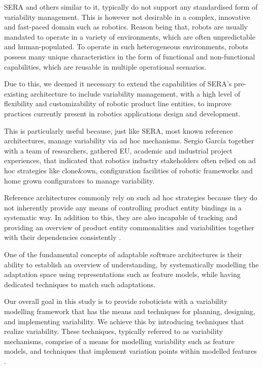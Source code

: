 \documentclass[conference]{IEEEtran}
\begin{document}
SERA and others similar to it, typically do not support any standardised form of variability management. This is however not desirable in a complex, innovative and fast-paced domain such as robotics. Reason being that, robots are usually mandated to operate in a variety of environments, which are often unpredictable and human-populated. To operate in such heterogeneous environments, robots possess many unique characteristics in the form of functional and non-functional capabilities, which are reusable in multiple operational scenarios.

Due to this, we deemed it necessary to extend the capabilities of SERA's pre-existing architecture to include variability management, with a high level of flexibility and customizability of robotic product line entities, to improve practices currently present in robotics applications design and development.

This is particularly useful because, just like SERA, most known reference architectures, manage variability via ad hoc mechanisms. Sergio Garc\'{i}a \cite{var-mod-chall} together with a team of researchers, gathered EU, academic and industrial project experiences, that indicated that robotics industry stakeholders often relied on ad hoc strategies like clone\&own, configuration facilities of robotic frameworks and home grown configurators to manage variability.

Reference architectures commonly rely on such ad hoc strategies because they do not inherently provide any means of controlling product entity bindings in a systematic way. In addition to this, they are also incapable of tracking and providing an overview of product entity commonalities and variabilities together with their dependencies consistently \cite{var-mod-ind}.

One of the fundamental concepts of adaptable software architectures is their ability to establish an overview of understanding, by systematically modelling the adaptation space using representations such as feature models, while having dedicated techniques to match such adaptations.

Our overall goal in this study is to provide roboticists with a variability modelling framework that has the means and techniques for planning, designing, and implementing variability. We achieve this by introducing techniques that realize variability. These techniques, typically referred to as variability mechanisms, comprise of a means for modelling variability such as feature models, and techniques that implement variation points within modelled features \cite{var-mod-ind}.
\end{document}
